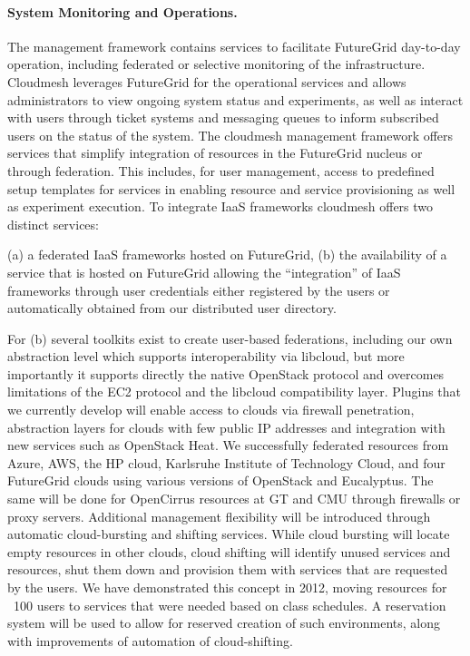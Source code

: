 \paragraph{System Monitoring and Operations.}

The management framework contains services to facilitate FutureGrid day-to-day operation, including federated or selective monitoring of the infrastructure. Cloudmesh leverages FutureGrid for the operational services and allows administrators to view ongoing system status and experiments, as well as interact with users through ticket systems and messaging queues to inform subscribed users on the status of the system.
The cloudmesh management framework offers services that simplify integration of resources in the FutureGrid nucleus or through federation. This includes, for user management, access to predefined setup templates for services in enabling resource and service provisioning as well as experiment execution. To integrate IaaS frameworks cloudmesh offers two distinct services:

(a) a federated IaaS frameworks hosted on FutureGrid,
(b) the availability of a service that is hosted on FutureGrid allowing the “integration” of IaaS frameworks through user credentials either registered by the users or automatically obtained from our distributed user directory.

For (b) several toolkits exist to create user-based federations, including our own abstraction level which supports interoperability via libcloud, but more importantly it supports directly the native OpenStack protocol and overcomes limitations of the EC2 protocol and the libcloud compatibility layer. Plugins that we currently develop will enable access to clouds via firewall penetration, abstraction layers for clouds with few public IP addresses and integration with new services such as OpenStack Heat. We successfully federated resources from Azure, AWS, the HP cloud, Karlsruhe Institute of Technology Cloud, and four FutureGrid clouds using various versions of OpenStack and Eucalyptus. The same will be done for OpenCirrus resources at GT and CMU through firewalls or proxy servers.
Additional management flexibility will be introduced through automatic cloud-bursting and shifting services. While cloud bursting will locate empty resources in other clouds, cloud shifting will identify unused services and resources, shut them down and provision them with services that are requested by the users. We have demonstrated this concept in 2012, moving resources for ~100 users to services that were needed based on class schedules. A reservation system will be used to allow for reserved creation of such environments, along with improvements of automation of cloud-shifting.

